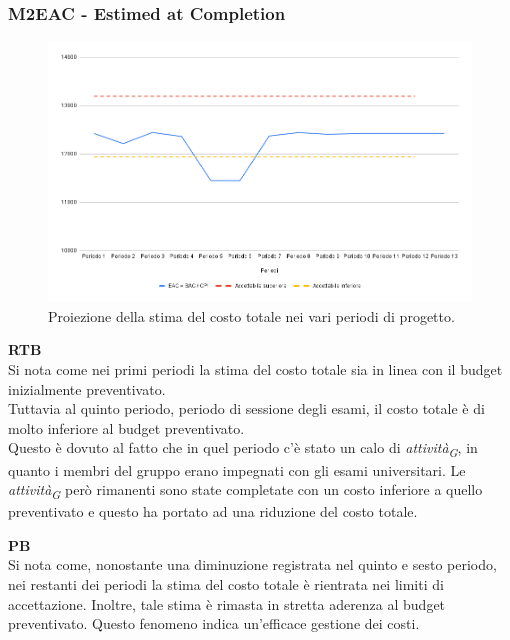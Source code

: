 \subsubsection{M2EAC - Estimed at Completion}

\vspace{0.3cm}

\begin{figure}[H]
    \centering
    \includegraphics[width=1\textwidth]{../Images/PianoDiQualifica/M2EAC.png}
    \caption{Proiezione della stima del costo totale nei vari periodi di progetto.}
    \label{fig:2}
\end{figure}

\vspace{0.2cm}

\textbf{RTB} \\
Si nota come nei primi periodi la stima del costo totale sia in linea con il budget inizialmente preventivato. \\
Tuttavia al quinto periodo, periodo di sessione degli esami, il costo totale è di molto inferiore al budget preventivato. \\
Questo è dovuto al fatto che in quel periodo c'è stato un calo di \textit{attività}\textsubscript{\textit{G}}, in quanto i membri del gruppo erano impegnati con gli esami universitari. Le \textit{attività}\textsubscript{\textit{G}} però rimanenti sono state completate con un costo inferiore a quello preventivato e questo ha portato ad una riduzione del costo totale.

\vspace{0.3cm}

\textbf{PB} \\
Si nota come, nonostante una diminuzione registrata nel quinto e sesto periodo, nei restanti dei periodi la stima del costo totale è rientrata nei limiti di accettazione. Inoltre, tale stima è rimasta in stretta aderenza al budget preventivato. Questo fenomeno indica un’efficace gestione dei costi.

